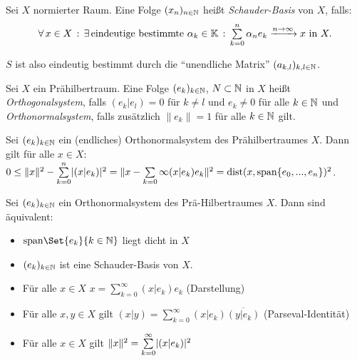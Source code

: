 \documentclass{cheat-sheet}
\newcommand{\K}{\mathbb{K}}
\newcommand{\dist}{\mathrm{dist}} %
\begin{document}
\begin{definition}
  Sei $X$ normierter Raum. Eine Folge $(x_n)_{n \in \mathbb{N}}$ heißt \emph{Schauder-Basis} von $X$, falls:
  \[ \fa{x \in X} \ex{\text{eindeutige bestimmte } \alpha_k \in \K} \sum_{k=0}^n \alpha_n e_k \xrightarrow{n \to \infty} x \text{ in } X. \]
\end{definition}


$S$ ist also eindeutig bestimmt durch die "`unendliche Matrix"' $(a_{k,l})_{k,l \in \mathbb{N}}$.


\begin{definition}
  Sei $X$ ein Prähilbertraum. Eine Folge $(e_k)_{k \in \mathbb{N}}$, $N \subset \mathbb{N}$ in $X$ heißt \emph{Orthogonalsystem}, falls $(e_k | e_l) = 0$ für $k \not= l$ und $e_k \not= 0$ für alle $k \in \mathbb{N}$ und \emph{Orthonormalsystem}, falls zusätzlich $\|e_k\| = 1$ für alle $k \in \mathbb{N}$ gilt.
\end{definition}

\begin{lem}
  Sei $(e_k)_{k \in \mathbb{N}}$ ein (endliches) Orthonormalsystem des Prähilbertraumes $X$. Dann gilt für alle $x \in X$: $0 \leq \|x\|^2 - \sum_{k=0}^n \abs{(x|e_k)}^2 = \| x - \sum_{k=0}\infty (x | e_k) e_k \|^2 = \dist(x, \mathrm{span} \{ e_0, ..., e_n \})^2$.
\end{lem}

\begin{satz}
  Sei $(e_k)_{k \in \mathbb{N}}$ ein Orthonormalsystem des Prä-Hilbertraumes $X$. Dann sind äquivalent:
  \begin{itemize}
    \item $\mathrm{span} \Set{ e_k }{ k \in \N }$ liegt dicht in $X$
    \item $(e_k)_{k \in \mathbb{N}}$ ist eine Schauder-Basis von $X$.
    \item Für alle $x \in X$ $x = \sum_{k=0}^\infty (x | e_k) e_k$ (Darstellung)
    \item Für alle $x, y \in X$ gilt $(x|y) = \sum_{k=0}^\infty (x|e_k) \overline{(y|e_k)}$ (Parseval-Identität)
    \item Für alle $x \in X$ gilt $\| x \|^2 = \sum_{k=0}^\infty \abs{(x|e_k)}^2$
  \end{itemize}
\end{satz}
\end{document}
